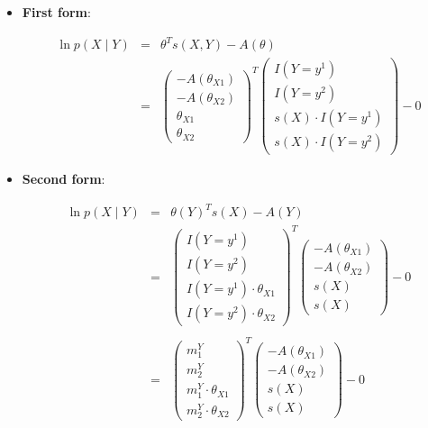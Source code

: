\documentclass[11pt, oneside]{article}   	%
\numberwithin{figure}{section}
\numberwithin{equation}{section}
\numberwithin{table}{section}
\begin{document}
\begin{itemize}

\item \textbf{First form}:

\begin{eqnarray*}
\ln p(X \mid Y) &=& \theta^T s(X,Y) - A(\theta) \\
&=&
\begin{pmatrix}
- A(\theta_{X1}) \\
- A(\theta_{X2}) \\
\theta_{X1} \\
\theta_{X2}
\end{pmatrix}^T
\begin{pmatrix}
I(Y=y^1) \\
I(Y=y^2) \\
s(X) \cdot I(Y=y^1) \\
s(X) \cdot I(Y=y^2)
\end{pmatrix}
- 0 
\end{eqnarray*}

\item \textbf{Second form}:

\begin{eqnarray*}
\ln p(X \mid Y) &=& \theta(Y)^Ts(X) - A(Y) \\
&=&
\begin{pmatrix}
I(Y=y^1)\\
I(Y=y^2)\\
I(Y=y^1) \cdot \theta_{X1}\\
I(Y=y^2) \cdot \theta_{X2}
\end{pmatrix}^T
\begin{pmatrix}
- A(\theta_{X1}) \\
- A(\theta_{X2}) \\
s(X) \\
s(X) 
\end{pmatrix}
- 0 \\\\
&=&
\begin{pmatrix}
m^Y_1\\
m^Y_2 \\
m^Y_1 \cdot \theta_{X1}\\
m^Y_2 \cdot \theta_{X2}
\end{pmatrix}^T
\begin{pmatrix}
- A(\theta_{X1}) \\
- A(\theta_{X2}) \\
s(X) \\
s(X) 
\end{pmatrix}
- 0 
\end{eqnarray*}


\end{itemize}
\end{document}
